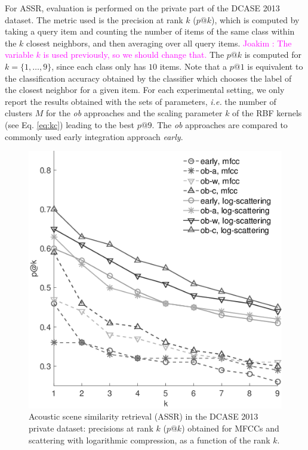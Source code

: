 \documentclass[journal]{IEEEtran}
\newcommand{\ja}[1]{\textcolor{magenta}{Joakim : #1}}
\begin{document}
For ASSR, evaluation is performed on the private part of the DCASE 2013 dataset. The metric used is the precision at rank $k$ ($p@k$), which is computed by taking a query item and counting the number of items of the same class within the $k$ closest neighbors, and then averaging over all query items. \ja{The variable $k$ is used previously, so we should change that.} The $p@k$ is computed for $k=\lbrace 1,\ldots,9\rbrace$, since each class only has $10$ items. Note that a $p@1$ is equivalent to the classification accuracy obtained by the classifier which chooses the label of the closest neighbor for a given item. For each experimental setting, we only report the results obtained with the sets of parameters, \emph{i.e.} the number of clusters $M$ for the \emph{ob} approaches and the scaling parameter $k$ of the RBF kernels (see Eq. \ref{eq:kc}) leading to the best $p@9$. The \emph{ob} approaches are compared to commonly used early integration approach \emph{early}.



\begin{figure}[t]
\begin{center}
\includegraphics[width=.9\columnwidth]{bw/unsupervised_test2}
\caption{Acoustic scene similarity retrieval (ASSR) in the DCASE 2013 private dataset: precisions at rank $k$ ($p@k$) obtained for MFCCs and scattering with logarithmic compression, as a function of the rank $k$.}
\label{fig:ASS_1}
\end{center}
\end{figure}
 
\end{document}
